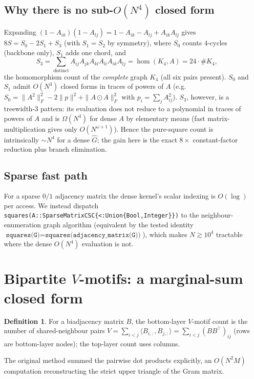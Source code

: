 \documentclass[11pt]{article}
\theoremstyle{plain}
\theoremstyle{definition}
\newtheorem{definition}{Definition}
\newcommand{\Ghat}{\hat{G}}
\newcommand{\had}{\odot} %
\begin{document}
\subsection{Why there is no sub-$O(N^4)$ closed form}
Expanding $(1-A_{ik})(1-A_{lj})=1-A_{ik}-A_{lj}+A_{ik}A_{lj}$ gives $8S=S_0-2S_1+S_3$ (with $S_1=S_2$ by
symmetry), where $S_0$ counts $4$-cycles (backbone only), $S_1$ adds one chord, and
\[
S_3=\sum_{\text{distinct}} A_{ij}A_{jk}A_{kl}A_{li}A_{ik}A_{lj}=\hom(K_4,A)=24\cdot\#K_4 ,
\]
the homomorphism count of the \emph{complete} graph $K_4$ (all six pairs present). $S_0$ and $S_1$ admit
$O(N^3)$ closed forms in traces of powers of $A$ (e.g.\ $S_0=\|A^2\|_F^2-2\|p\|^2+\|A\had A\|_F^2$ with
$p_i=\sum_j A_{ij}^2$). $S_3$, however, is a treewidth-$3$ pattern: its evaluation does not reduce to a
polynomial in traces of powers of $A$ and is $\Omega(N^4)$ for dense $A$ by elementary means (fast
matrix-multiplication gives only $O(N^{\omega+1})$). Hence the pure-square count is intrinsically $\sim N^4$
for a dense $\Ghat$; the gain here is the exact $8\times$ constant-factor reduction plus branch elimination.

\subsection{Sparse fast path}
For a sparse $0/1$ adjacency matrix the dense kernel's scalar indexing is $O(\log)$ per access. We instead
dispatch \texttt{squares(A::SparseMatrixCSC\{<:Union\{Bool,Integer\}\})} to the neighbour-enumeration graph
algorithm (equivalent by the tested identity $\texttt{squares(G)}=\texttt{squares(adjacency\_matrix(G))}$),
which makes $N\gtrsim 10^4$ tractable where the dense $O(N^4)$ evaluation is not.

\section{Bipartite $V$-motifs: a marginal-sum closed form}
\label{sec:vmotifs}

\begin{definition}
For a biadjacency matrix $B$, the bottom-layer $V$-motif count is the number of shared-neighbour pairs
$V=\sum_{i<j}\langle B_{i,:},B_{j,:}\rangle=\sum_{i<j}(BB^\top)_{ij}$ (rows are bottom-layer nodes); the
top-layer count uses columns.
\end{definition}

The original method summed the pairwise dot products explicitly, an $O(N^2 M)$ computation reconstructing the
strict upper triangle of the Gram matrix.
\end{document}
